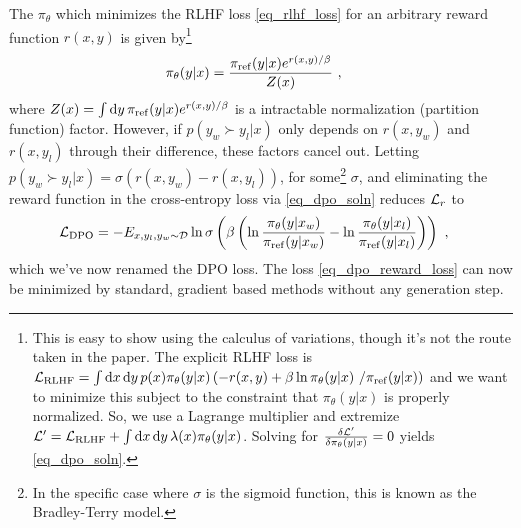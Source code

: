 The $ \pi _{ \theta  } $ which minimizes the RLHF loss \eqref{eq_rlhf_loss} for
an arbitrary reward function $ r(x, y) $ is given by\footnote{This is easy to show using the
calculus of variations, though it's not the route taken in the paper. The explicit RLHF loss is $
\mathcal{L} _{ {\rm RLHF} } = \int {\rm d} x\,{\rm d} y\,p(x) \pi _{ \theta  }(y|x)\left ( -r(x,y) +\beta \ln \pi _{
\theta }(y|x)\ /\pi _{ {\rm ref} }(y|x) \right )  $ and we want to minimize this subject to the
constraint that $ \pi _{ \theta  }(y|x) $ is properly normalized. So, we use a Lagrange multiplier
and extremize $ \mathcal{L}'  = \mathcal{L} _{ {\rm RLHF} }+ \int {\rm d} x\,{\rm d} y\, \lambda (x) \pi _{ \theta
}(y|x)   $. Solving for $ \frac{ \delta \mathcal{L} ' }{ \delta \pi _{ \theta  } (y|x)} =0$ yields
\eqref{eq_dpo_soln}.
}
\begin{align}
\pi _{\theta}(y|x) &= \frac{ \pi _{ {\rm ref}} (y|x)e ^{ r(x, y)/ \beta  }  }{ Z(x) } \ ,\label{eq_dpo_soln}
\end{align}
where $ Z(x) = \int {\rm d} y\, \pi _{ {\rm ref} }(y|x)e^{ r(x, y)/ \beta  }$ is a intractable
normalization (partition function) factor. However, if  $p(y _{ w } \succ y _{ l }| x )$ only
depends on $ r(x, y _{ w }) $ and $ r(x, y _{ l }) $ through their difference, these factors cancel
out. Letting $ p(y _{ w } \succ y _{ l }| x ) = \sigma ( r(x, y _{ w })- r(x, y _{ l }) ) $, for
some\footnote{In the specific case where $ \sigma  $ is the sigmoid function, this is known as the
Bradley-Terry model.} $ \sigma  $, and eliminating the reward function in the cross-entropy loss via
\eqref{eq_dpo_soln} reduces $ \mathcal{L} _{ r } $ to
\begin{align}
    \mathcal{L} _{ {\rm DPO} } &= -E _{ x, y _{ l }, y _{ w } \sim \mathcal{D} } \ln \sigma \left (\beta \left (\ln \frac{ \pi _{
\theta }(y|x _{ w }) }{ \pi _{ {\rm ref} }(y|x _{ w }) }-\ln \frac{ \pi _{ \theta }(y|x _{ l }) }{ \pi
_{ {\rm ref} }(y|x _{  l}) }  \right )\right ) \ , \label{eq_dpo_reward_loss}
\end{align}
which we've now renamed the DPO loss.   The loss \eqref{eq_dpo_reward_loss} can now be minimized by
standard, gradient based methods without any generation step.





